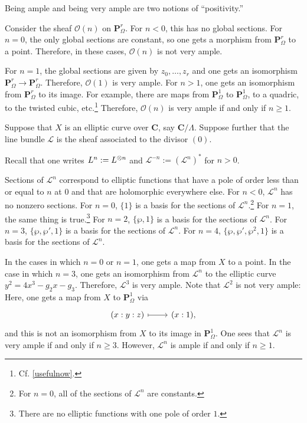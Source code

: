 \documentclass [11 pt, oneside] {article}
\begin{document}
\begin{remark}
	Being ample and being very ample are two notions of ``positivity.''
\end{remark}

\begin{example}[ ]\label{}\text{}
Consider the sheaf $\mathscr{O}(n)$ on $\mathbf{P}^r_\Omega$. For $n<0$, this has no global sections. For $n=0$, the only global sections are constant, so one gets a morphism from $\mathbf{P}^r_\Omega$ to a point. Therefore, in these cases, $\mathscr{O}(n)$ is not very ample.

For $n=1$, the global sections are given by $z_0,\hdots, z_r$ and one gets an isomorphism $\mathbf{P}^r_\Omega\longrightarrow \mathbf{P}^r_\Omega$. Therefore, $\mathscr{O}(1)$ is very ample. For $n>1$, one gets an isomorphism from $\mathbf{P}^r_\Omega$ to its image. For example, there are maps from $\mathbf{P}^1_\Omega$ to $\mathbf{P}^1_\Omega$, to a quadric, to the twisted cubic, etc.\footnote{Cf. \cref{usefulnow}.} Therefore, $\mathscr{O}(n)$ is very ample if and only if $n\ge 1$.
\end{example}

\begin{example}\label{}\text{}
Suppose that $X$ is an elliptic curve over $\mathbf{C}$, say $\mathbf{C}/\Lambda$. Suppose further that the line bundle $\mathscr{L}$ is the sheaf associated to the divisor $(0)$.

Recall that one writes $\relax{L}^n := \relax{L}^{\otimes n}$ and $\mathscr{L}^{-n} := (\mathscr{L}^n)^*$ for $n>0$.

Sections of $\mathscr{L}^n$ correspond to elliptic functions that have a pole of order less than or equal to $n$ at $0$ and that are holomorphic everywhere else. For $n<0$, $\mathscr{L}^n$ has no nonzero sections. For $n=0$, $\{1\}$ is a basis for the sections of $\mathscr{L}^n$.\footnote{For $n=0$, all of the sections of $\mathscr{L}^n$ are constants.}
For $n=1$, the same thing is true.\footnote{There are no elliptic functions with one pole of order $1$.}
For $n=2$, $\{\wp,1\}$ is a basis for the sections of $\mathscr{L}^n$. 
For $n=3$, $\{\wp,\wp',1\}$ is a basis for the sections of $\mathscr{L}^n$.
For $n=4$, $\{\wp,\wp',\wp^2, 1\}$ is a basis for the sections of $\mathscr{L}^n$.

In the cases in which $n=0$ or $n=1$, one gets a map from $X$ to a point. In the case in which $n=3$, one gets an isomorphism from $\mathscr{L}^n$ to the elliptic curve $y^2 = 4x^3 - g_2x-g_3$. Therefore, $\mathscr{L}^3$ is very ample.
Note that $\mathscr{L}^2$ is not very ample: Here, one gets a map from $X$ to $\mathbf{P}^1_\Omega$ via
\[
\begin{tikzcd}
	(x:y:z)\ar[r,mapsto] &  (x:1),
\end{tikzcd}
\]
and this is not an isomorphism from $X$ to its image in $\mathbf{P}^1_\Omega$.
One sees that $\mathscr{L}^n$ is very ample if and only if $n \ge 3$. However, $\mathscr{L}^n$ is ample if and only if $n \ge 1$.
\end{example}
\end{document}

